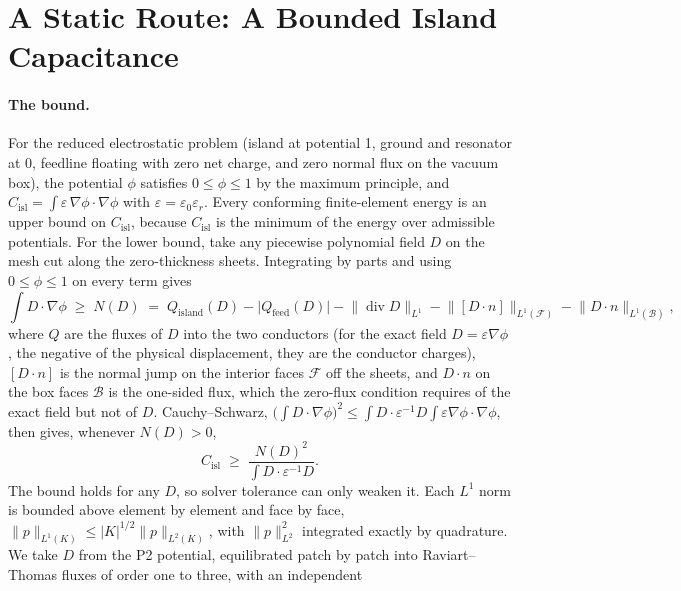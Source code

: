 \documentclass{anvil-paper}
\newcommand{\Cisl}{C_{\mathrm{isl}}}
\begin{document}
\section{A Static Route: A Bounded Island Capacitance}
\label{sec:static}

\paragraph{The bound.}
For the reduced electrostatic problem (island at potential 1, ground and
resonator at 0, feedline floating with zero net charge, and zero normal
flux on the vacuum box), the potential
$\phi$ satisfies $0 \le \phi \le 1$ by the maximum principle, and
$\Cisl = \int \varepsilon\,\nabla\phi\cdot\nabla\phi$ with $\varepsilon
= \varepsilon_0\varepsilon_r$. Every conforming finite-element energy is an
upper bound on $\Cisl$, because $\Cisl$ is the minimum of the energy
over admissible potentials. For the lower bound, take any piecewise
polynomial field $D$ on the mesh cut along the zero-thickness sheets.
Integrating by parts and using $0\le\phi\le1$ on every term gives
\begin{equation}
  \int D\cdot\nabla\phi \;\ge\; N(D) \;=\; Q_{\mathrm{island}}(D)
  - \lvert Q_{\mathrm{feed}}(D)\rvert
  - \lVert \operatorname{div} D\rVert_{L^1}
  - \lVert [D\cdot n]\rVert_{L^1(\mathcal F)}
  - \lVert D\cdot n\rVert_{L^1(\mathcal B)},
  \label{eq:cert-n}
\end{equation}
where $Q$ are the fluxes of $D$ into the two conductors (for the exact
field $D = \varepsilon\nabla\phi$, the negative of the physical
displacement, they are the conductor charges),
$[D\cdot n]$ is the normal jump on the interior faces $\mathcal F$ off
the sheets, and $D\cdot n$ on the box faces $\mathcal B$ is the one-sided
flux, which the zero-flux condition requires of the exact field but not
of $D$. Cauchy--Schwarz, $\bigl(\int D\cdot\nabla\phi\bigr)^2 \le
\int D\cdot\varepsilon^{-1}D \int\varepsilon\nabla\phi\cdot\nabla\phi$,
then gives, whenever $N(D) > 0$,
\begin{equation}
  \Cisl \;\ge\; \frac{N(D)^2}{\int D\cdot\varepsilon^{-1}D}.
  \label{eq:cert}
\end{equation}
The bound holds for any $D$, so solver tolerance can only weaken it. Each
$L^1$ norm is bounded above element by element and face by face,
$\lVert p\rVert_{L^1(K)} \le |K|^{1/2}\lVert p\rVert_{L^2(K)}$, with
$\lVert p\rVert_{L^2}^2$ integrated exactly by quadrature. We
take $D$ from the P2 potential, equilibrated patch by patch into
Raviart--Thomas fluxes of order one to three, with an independent
\end{document}
